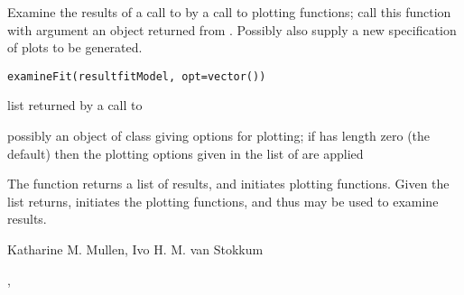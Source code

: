 \documentclass{article}
\begin{document}
\begin{Description}\relax
Examine the results of a call to   
by a call to plotting functions; call this function with argument 
an object returned from .  Possibly also supply a new 
specification of plots to be generated.
\end{Description}
\begin{Usage}
\begin{verbatim}
examineFit(resultfitModel, opt=vector())
\end{verbatim}
\end{Usage}
\begin{Arguments}
\begin{ldescription}
\item[\code{resultfitModel}] list returned by a call to  
\item[\code{opt}] possibly an object of class  giving options for 
plotting; if  has length zero (the default) then the plotting
options given in the  list of  are 
applied
\end{ldescription}
\end{Arguments}
\begin{Details}\relax
The   function returns a list of results, and initiates plotting
functions.  Given the  list   returns, 
 initiates the plotting functions, and thus may be 
used to examine results.
\end{Details}
\begin{Author}\relax
Katharine M. Mullen, Ivo H. M. van Stokkum
\end{Author}
\begin{SeeAlso}\relax
{}, 
\end{SeeAlso}
\end{document}
